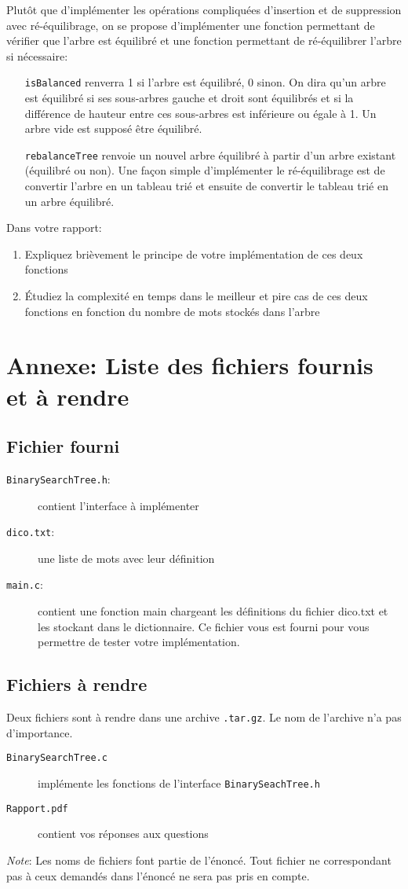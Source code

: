 \documentclass[a4paper,10pt]{article}
\begin{document}
Plutôt que d'implémenter les opérations compliquées d'insertion et de
suppression avec ré-équilibrage, on se propose d'implémenter une
fonction permettant de vérifier que l'arbre est équilibré et une
fonction permettant de ré-équilibrer l'arbre si nécessaire:
\begin{itemize}
\item[\texttt{isBalanced}] renverra 1 si l'arbre est équilibré, 0
  sinon. On dira qu'un arbre est équilibré si ses sous-arbres gauche
  et droit sont équilibrés et si la différence de hauteur entre ces
  sous-arbres est inférieure ou égale à 1. Un arbre vide est supposé
  être équilibré.
\item[\texttt{rebalanceTree}] renvoie un nouvel arbre équilibré à
  partir d'un arbre existant (équilibré ou non). Une façon simple
  d'implémenter le ré-équilibrage est de convertir l'arbre en un
  tableau trié et ensuite de convertir le tableau trié en un arbre
  équilibré.
\end{itemize}

Dans votre rapport:
\begin{enumerate}
\item Expliquez brièvement le principe de votre implémentation de ces deux fonctions
\item \'Etudiez la complexité en temps dans le meilleur et pire cas de
  ces deux fonctions en fonction du nombre de mots stockés dans
  l'arbre
\end{enumerate}

\section*{Annexe: Liste des fichiers fournis et à rendre}

\subsection*{Fichier fourni}
\begin{description}
\item[\texttt{BinarySearchTree.h}:] contient l'interface à implémenter
\item[\texttt{dico.txt}:] une liste de mots avec leur définition
\item[\texttt{main.c}:] contient une fonction main chargeant les définitions du fichier dico.txt et les stockant dans le dictionnaire. Ce fichier vous est fourni pour vous permettre de tester votre implémentation.
\end{description}
\subsection*{Fichiers à rendre}
Deux fichiers sont à rendre dans une archive \texttt{.tar.gz}. Le nom de l'archive n'a pas d'importance.
\begin{description}
\item[\texttt{BinarySearchTree.c}] implémente les fonctions de l'interface \texttt{BinarySeachTree.h}
\item[\texttt{Rapport.pdf}] contient vos réponses aux questions
\end{description}

{\em Note}: Les noms de fichiers font partie de l'énoncé. Tout fichier ne
correspondant pas à ceux demandés dans l'énoncé ne sera pas pris en compte.
\end{document}
